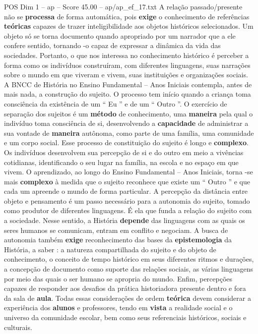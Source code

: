 \begin{textsample}{POS Dim 1 – ap – Score 45.00 – ap/ap\_ef\_17.txt}
A relação passado/presente não se \textbf{processa} de forma automática, pois \textbf{exige} o conhecimento de referências \textbf{teóricas} capazes de trazer inteligibilidade aos objetos históricos selecionados.
Um objeto só se torna documento quando apropriado por um narrador que a ele confere sentido, tornando -o capaz de expressar a dinâmica da vida das sociedades.
Portanto, o que nos interessa no conhecimento histórico é perceber a forma como os indivíduos construíram, com diferentes linguagens, suas narrações sobre o mundo em que viveram e vivem, suas instituições e organizações sociais.
A BNCC de História no Ensino Fundamental – Anos Iniciais contempla, antes de mais nada, a construção do sujeito.
O processo tem início quando a criança toma consciência da existência de um “ Eu ” e de um “ Outro ”.
O exercício de separação dos sujeitos é um \textbf{método} de conhecimento, uma \textbf{maneira} pela qual o indivíduo toma consciência de si, desenvolvendo a \textbf{capacidade} de administrar a sua vontade de \textbf{maneira} autônoma, como parte de uma família, uma comunidade e um corpo social.
Esse processo de constituição do sujeito é longo e \textbf{complexo}.
Os indivíduos desenvolvem sua percepção de si e do outro em meio a vivências cotidianas, identificando o seu lugar na família, na escola e no espaço em que vivem.
O aprendizado, ao longo do Ensino Fundamental – Anos Iniciais, torna -se mais \textbf{complexo} à medida que o sujeito reconhece que existe um “ Outro ” e que cada um apreende o mundo de forma particular.
A percepção da distância entre objeto e pensamento é um passo necessário para a autonomia do sujeito, tomado como produtor de diferentes linguagens.
É ela que funda a relação do sujeito com a sociedade.
Nesse sentido, a História \textbf{depende} das linguagens com as quais os seres humanos se comunicam, entram em conflito e negociam.
A busca de autonomia também \textbf{exige} reconhecimento das bases da \textbf{epistemologia} da História, a saber : a natureza compartilhada do sujeito e do objeto de conhecimento, o conceito de tempo histórico em seus diferentes ritmos e durações, a concepção de documento como suporte das relações sociais, as várias linguagens por meio das quais o ser humano se apropria do mundo.
Enfim, percepções capazes de responder aos desafios da prática historiadora presente dentro e fora da sala de \textbf{aula}.
Todas essas considerações de ordem \textbf{teórica} devem considerar a experiência dos \textbf{alunos} e professores, tendo em \textbf{vista} a realidade social e o universo da comunidade escolar, bem como seus referenciais históricos, sociais e culturais.

\end{textsample}
